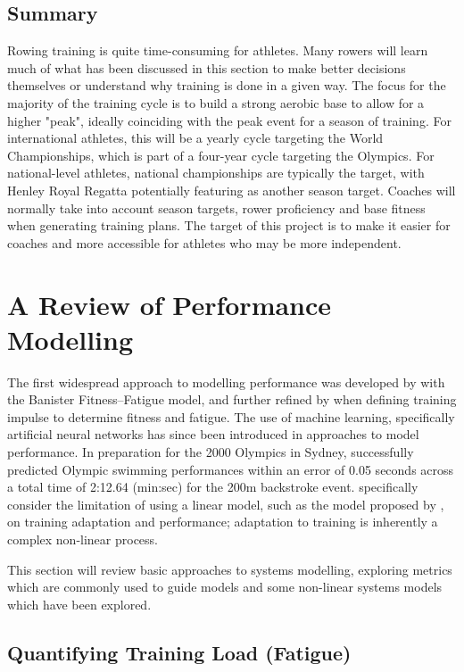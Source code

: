 \subsection{Summary}
Rowing training is quite time-consuming for athletes. Many rowers will learn much of what has been discussed in this section to make better decisions themselves or understand why training is done in a given way. The focus for the majority of the training cycle is to build a strong aerobic base to allow for a higher "peak", ideally coinciding with the peak event for a season of training. For international athletes, this will be a yearly cycle targeting the World Championships, which is part of a four-year cycle targeting the Olympics. For national-level athletes, national championships are typically the target, with Henley Royal Regatta potentially featuring as another season target. Coaches will normally take into account season targets, rower proficiency and base fitness when generating training plans. The target of this project is to make it easier for coaches and more accessible for athletes who may be more independent. 

\section{A Review of Performance Modelling}
The first widespread approach to modelling performance was developed by \textcite{Bannister1976} with the Banister Fitness--Fatigue model, and further refined by \textcite{Morton1990} when defining training impulse to determine fitness and fatigue. The use of machine learning, specifically artificial neural networks has since been introduced in approaches to model performance. In preparation for the 2000 Olympics in Sydney, \textcite{Edelmannnusser2002} successfully predicted Olympic swimming performances within an error of 0.05 seconds across a total time of 2:12.64 (min:sec) for the 200m backstroke event. \textcite{Edelmannnusser2002} specifically consider the limitation of using a linear model, such as the model proposed by \textcite{Bannister1976}, on training adaptation and performance; adaptation to training is inherently a complex non-linear process. 

This section will review basic approaches to systems modelling, exploring metrics which are commonly used to guide models and some non-linear systems models which have been explored. 

\subsection{\label{sec:quant-training}Quantifying Training Load (Fatigue)}
